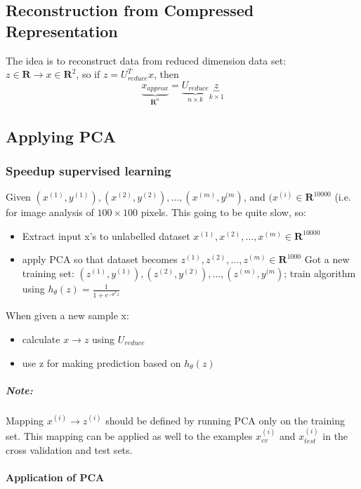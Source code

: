 \documentclass{scrartcl}
\begin{document}
\subsection{Reconstruction from Compressed Representation}
\label{sec:14-6}

The idea is to reconstruct data from reduced dimension data set: $z
\in \mathbf{R} \rightarrow x \in \mathbf{R}^2$, so if $z =
U^T_{reduce} x$, then \[ \underbrace{x_{approx}}_{\mathbf{R}^n} =
\underbrace{U_{reduce}}_{n \times k} \underbrace{z}_{k \times 1} \]

\subsection{Applying PCA}
\label{sec:14-7}

\subsubsection{Speedup supervised learning}
\label{sec:14-7-1}

Given $(x^{(1)}, y^{(1)}),(x^{(2)}, y^{(2)}),\dots, (x^{(m)},
y^{(m})$, and $(x^{(i)} \in \mathbf{R}^{10000}$ (i.e. for image
analysis of $100 \times 100$ pixels. This going to be quite slow, so:
\begin{itemize}
\item Extract input x's to unlabelled dataset $x^{(1)},x^{(2)},\dots,
  x^{(m)} \in \mathbf{R}^{10000}$
\item apply PCA so that dataset becomes $z^{(1)},z^{(2)},\dots,
  z^{(m)} \in \mathbf{R}^{1000}$
Got a new training set:  $(z^{(1)}, y^{(1)}),(z^{(2)}, y^{(2)}),\dots, (z^{(m)},
y^{(m})$; train algorithm using $h_\theta(z) = \frac{1}{1 +
  e^{-\theta^Tz}}$
\end{itemize}

When given a new sample x:
\begin{itemize}
\item calculate $x \rightarrow z$ using $U_{reduce}$
\item use z for making prediction based on $h_\theta(z)$
\end{itemize}

\subparagraph{Note:}
Mapping $x^{(i)} \rightarrow z^{(i)}$ should be defined by running PCA
only on the training set. This mapping can be applied as well to the
examples $x_{cv}^{(i)}$ and $x_{test}^{(i)}$ in the cross validation
and test sets.

\paragraph{Application of PCA}
\end{document}
